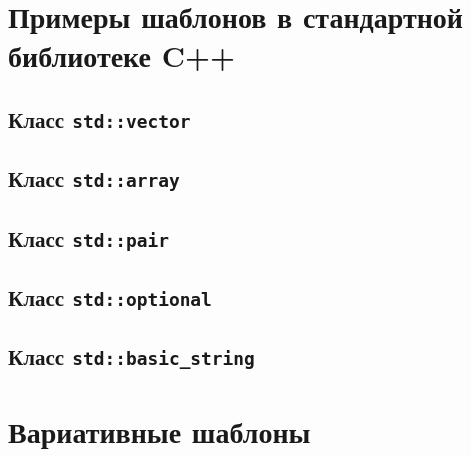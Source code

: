 \documentclass{article}
\begin{document}
\section*{Примеры шаблонов в стандартной библиотеке C++}
\subsection*{Класс \texttt{std::vector}}
\subsection*{Класс \texttt{std::array}}
\subsection*{Класс \texttt{std::pair}}
\subsection*{Класс \texttt{std::optional}}
\subsection*{Класс \texttt{std::basic\_string}}


\section*{Вариативные шаблоны}
\end{document}
